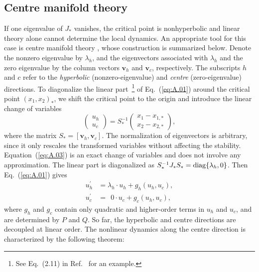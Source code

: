 \documentclass[aps,prd,twocolumn]{revtex4-2}
\begin{document}
\subsection{Centre manifold theory}\label{sec:App.A.2}
If one eigenvalue of $J_\ast$ vanishes, the critical point is nonhyperbolic and linear theory alone cannot determine the local dynamics. An appropriate tool for this case is centre manifold theory \cite{Carr1981.book,Bahamonde2018.PhysRep.775.1}, whose construction is summarized below. Denote the nonzero eigenvalue by $\lambda_h$, and the eigenvectors associated with $\lambda_h$ and the zero eigenvalue by the column vectors $\mathbf{v}_h$ and $\mathbf{v}_c$, respectively. The subscripts $h$ and $c$ refer to the \textit{hyperbolic} (nonzero-eigenvalue) and \textit{centre} (zero-eigenvalue) directions. To diagonalize the linear part~\footnote{See Eq.~(2.11) in Ref.~\cite{Bahamonde2018.PhysRep.775.1} for an example.} of Eq.~(\ref{eq:A.01}) around the critical point $(x_1,x_2)_\ast$, we shift the critical point to the origin and introduce the linear change of variables
\begin{equation}\label{eq:A.03}
  \begin{pmatrix}
    u_h \\
    u_c 
  \end{pmatrix}
  =
  S_\ast^{-1}
  \begin{pmatrix}
    x_1 - x_{1,\ast} \\
    x_2 - x_{2,\ast}
  \end{pmatrix},
\end{equation}
where the matrix $S_\ast=[\mathbf{v}_h,\mathbf{v}_c]$. The normalization of eigenvectors is arbitrary, since it only rescales the transformed variables without affecting the stability. Equation~(\ref{eq:A.03}) is an exact change of variables and does not involve any approximation. The linear part is diagonalized as $S_\ast^{-1}J_\ast S_\ast={\rm diag}\{\lambda_h,0\}$. Then Eq.~(\ref{eq:A.01}) gives
\begin{equation}\label{eq:A.04}
\begin{aligned}
  u_h^\prime &= \lambda_h\cdot u_h + g_h(u_h,u_c), \\
  u_c^\prime &= \ \  0\cdot u_c + g_c(u_h,u_c),
\end{aligned}
\end{equation}
where $g_h$ and $g_c$ contain only quadratic and higher-order terms in $u_h$ and $u_c$, and are determined by $P$ and $Q$. So far, the hyperbolic and centre directions are decoupled at linear order. The nonlinear dynamics along the centre direction is characterized by the following theorem:
\end{document}
